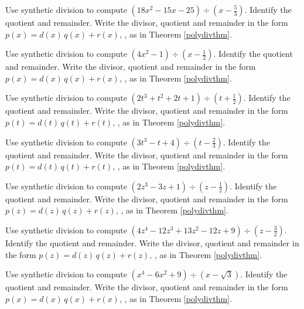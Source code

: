 \documentclass{ximera}
\begin{document}
\begin{problem}
Use synthetic division to compute $\left(18x^2-15x-25\right) \div \left(x - \frac{5}{3} \right)$.  Identify the quotient and remainder. Write the divisor, quotient and remainder in the form $p(x) = d(x) \, q(x) + r(x),\,$, as in Theorem \ref{polydivthm}.
\end{problem}

\begin{problem}
Use synthetic division to compute $\left(4x^2-1 \right) \div \left(x - \frac{1}{2} \right)$.  Identify the quotient and remainder. Write the divisor, quotient and remainder in the form $p(x) = d(x) \, q(x) + r(x),\,$, as in Theorem \ref{polydivthm}.
\end{problem}

\begin{problem}
Use synthetic division to compute $\left(2t^3+t^2+2t+1 \right) \div \left(t + \frac{1}{2} \right)$.  Identify the quotient and remainder. Write the divisor, quotient and remainder in the form $p(t) = d(t) \, q(t) + r(t),\,$, as in Theorem \ref{polydivthm}.
\end{problem}

\begin{problem}
Use synthetic division to compute $\left(3t^3 - t + 4 \right) \div \left(t - \frac{2}{3} \right)$.  Identify the quotient and remainder. Write the divisor, quotient and remainder in the form $p(t) = d(t) \, q(t) + r(t),\,$, as in Theorem \ref{polydivthm}.
\end{problem}

\begin{problem}
Use synthetic division to compute $\left(2z^3 - 3z +1 \right) \div \left(z - \frac{1}{2} \right)$.  Identify the quotient and remainder. Write the divisor, quotient and remainder in the form $p(z) = d(z) \, q(z) + r(z),\,$, as in Theorem \ref{polydivthm}.
\end{problem}

\begin{problem}
Use synthetic division to compute $\left(4z^4-12z^3+13z^2 -12z+9\right) \div \left(z - \frac{3}{2} \right)$.  Identify the quotient and remainder. Write the divisor, quotient and remainder in the form $p(z) = d(z) \, q(z) + r(z),\,$, as in Theorem \ref{polydivthm}.
\end{problem}

\begin{problem}
Use synthetic division to compute $\left(x^4-6x^2+9 \right) \div \left(x -\sqrt{3} \right)$.  Identify the quotient and remainder. Write the divisor, quotient and remainder in the form $p(x) = d(x) \, q(x) + r(x),\,$, as in Theorem \ref{polydivthm}.
\end{problem}
\end{document}
